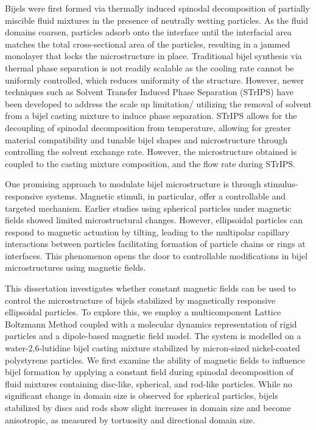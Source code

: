 \begin{front}
    Bijels were first formed via thermally induced spinodal decomposition of partially miscible fluid mixtures in the presence of neutrally 
    wetting particles. As the fluid domains coarsen, particles adsorb onto the interface until the interfacial area matches the 
    total cross-sectional area of the particles, resulting in a jammed monolayer that locks the microstructure in place. Traditional 
    bijel synthesis via thermal phase separation is not readily scalable as the cooling rate cannot be uniformly controlled, which
    reduces uniformity of the structure. However, newer techniques such as Solvent Transfer Induced Phase Separation (STrIPS) have been 
    developed to address the scale up limitation/ utilizing the removal of solvent from a bijel casting
    mixture to induce phase separation. STrIPS allows for the decoupling of spinodal decomposition from temperature, allowing for greater
    material compatibility and tunable bijel shapes and microstructure through controlling the solvent exchange rate. However, the 
    microstructure obtained is coupled to the casting mixture composition, and the flow rate during STrIPS.
    
    One promising approach to modulate bijel microstructure is through stimulus-responsive systems. Magnetic stimuli, in particular, 
    offer a controllable and targeted mechanism. Earlier studies using spherical particles under magnetic fields showed 
    limited microstructural changes. However, ellipsoidal particles can respond to magnetic actuation 
    by tilting, leading to the multipolar capillary interactions between particles facilitating formation of particle chains or rings at 
    interfaces. This phenomenon opens the door to controllable modifications in bijel microstructures using magnetic fields.
    
    This dissertation investigates whether constant magnetic fields can be used to control the microstructure of bijels stabilized by 
    magnetically responsive ellipsoidal particles. To explore this, we employ a multicomponent Lattice Boltzmann Method coupled with a 
    molecular dynamics representation of rigid particles and a dipole-based magnetic field model. The system is modelled on a water-2,6-lutidine 
    bijel casting mixture stabilized by micron-sized nickel-coated polystyrene particles.
    We first examine the ability of magnetic fields to influence bijel formation by applying a constant field during spinodal decomposition
    of fluid mixtures containing disc-like, spherical, and rod-like particles. While no significant change in domain size is observed for 
    spherical particles, bijels stabilized by discs and rods show slight increases in domain size and become anisotropic, as measured by 
    tortuosity and directional domain size.
    

\end{front}
